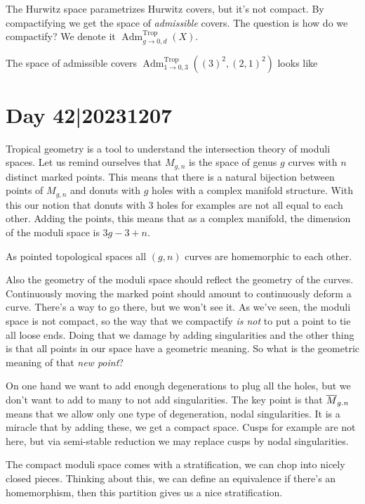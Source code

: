 \documentclass[12pt]{memoir}
\DeclareMathOperator{\Trop}{Trop}
\begin{document}
The Hurwitz space parametrizes Hurwitz covers, but it's not compact. By compactifying we get the space of \emph{admissible} covers. The question is how do we compactify?  We denote it $\operatorname{Adm}^{\Trop}_{g\to 0,d}(X)$.

\begin{Ex}
    The space of admissible covers $\operatorname{Adm}^{\Trop}_{1\to 0,3}((3)^2,(2,1)^2)$ looks like 
\end{Ex}

\section{Day 42|20231207}

Tropical geometry is a tool to understand the intersection theory of moduli spaces. Let us remind ourselves that $M_{g,n}$ is the space of genus $g$ curves with $n$ distinct marked points. This means that there is a natural bijection between points of $M_{g,n}$ and donuts with $g$ holes with a complex manifold structure. With this our notion that donuts with 3 holes for examples are not all equal to each other. Adding the points, this means that as a complex manifold, the dimension of the moduli space is $3g-3+n$.

\begin{Rmk}
    As pointed topological spaces all $(g,n)$ curves are homemorphic to each other.
\end{Rmk}

Also the geometry of the moduli space should reflect the geometry of the curves. Continuously moving the marked point should amount to continuously deform a curve. There's a way to go there, but we won't see it. As we've seen, the moduli space is not compact, so the way that we compactify \emph{is not} to put a point to tie all loose ends. Doing that we damage by adding singularities and the other thing is that all points in our space have a geometric meaning. So what is the geometric meaning of that \emph{new point}?\par 
On one hand we want to add enough degenerations to plug all the holes, but we don't want to add to many to not add singularities. The key point is that $\overline{M}_{g.n}$ means that we allow only one type of degeneration, nodal singularities. It is a miracle that by adding these, we get a compact space. Cusps for example are not here, but via semi-stable reduction we may replace cusps by nodal singularities.\par 
The compact moduli space comes with a stratification, we can chop into nicely closed pieces. Thinking about this, we can define an equivalence if there's an homemorphism, then this partition gives us a nice stratification. 
\end{document}
